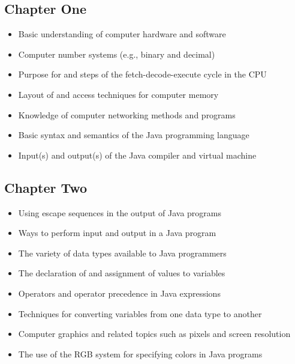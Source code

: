 \documentclass[11pt]{article}
\begin{document}
\vspace*{-.1in}
\subsection*{Chapter One}

\begin{itemize}

  \itemsep 0in
  \item Basic understanding of computer hardware and software
  \item Computer number systems (e.g., binary and decimal)
  \item Purpose for and steps of the fetch-decode-execute cycle in the CPU
  \item Layout of and access techniques for computer memory
  \item Knowledge of computer networking methods and programs
  \item Basic syntax and semantics of the Java programming language
  \item Input(s) and output(s) of the Java compiler and virtual machine

\end{itemize}

\vspace*{-.2in}
\subsection*{Chapter Two}
\vspace*{-.1in}

\begin{itemize}

  \itemsep -.015in
  \item Using escape sequences in the output of Java programs
  \item Ways to perform input and output in a Java program
  \item The variety of data types available to Java programmers
  \item The declaration of and assignment of values to variables
  \item Operators and operator precedence in Java expressions
  \item Techniques for converting variables from one data type to another
  \item Computer graphics and related topics such as pixels and screen resolution
  \item The use of the RGB system for specifying colors in Java programs

\end{itemize}
\end{document}
